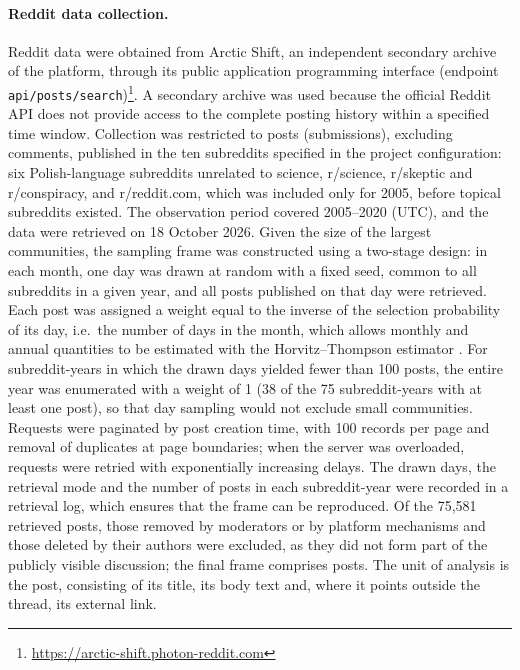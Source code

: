\documentclass[10pt,a4paper]{article}
\newcommand{\kod}[1]{\texttt{#1}}
\begin{document}
\paragraph{Reddit data collection.}
Reddit data were obtained from Arctic Shift, an independent secondary archive of the
platform, through its public application programming interface (endpoint
\kod{api/posts/search})\footnote{\url{https://arctic-shift.photon-reddit.com}}. A secondary
archive was used because the official Reddit API does not provide access to the complete
posting history within a specified time window. Collection was restricted to posts
(submissions), excluding comments, published in the ten subreddits specified in the
project configuration: six Polish-language subreddits unrelated to science, r/science,
r/skeptic and r/conspiracy, and r/reddit.com, which was included only for 2005, before
topical subreddits existed. The observation period covered 2005--2020 (UTC), and the data
were retrieved on 18 October 2026. Given the size of the largest communities, the sampling
frame was constructed using a two-stage design: in each month, one day was drawn at random
with a fixed seed, common to all subreddits in a given year, and all posts published on
that day were retrieved. Each post was assigned a weight equal to the inverse of the
selection probability of its day, i.e.\ the number of days in the month, which allows
monthly and annual quantities to be estimated with the Horvitz--Thompson estimator
\cite{horvitz1952}. For subreddit-years in which the drawn days yielded fewer than 100
posts, the entire year was enumerated with a weight of 1 (38 of the 75 subreddit-years with
at least one post), so that day sampling would not exclude small communities. Requests
were paginated by post creation time, with 100 records per page and removal of duplicates
at page boundaries; when the server was overloaded, requests were retried with
exponentially increasing delays. The drawn days, the retrieval mode and the number of
posts in each subreddit-year were recorded in a retrieval log, which ensures that the
frame can be reproduced. Of the 75,581 retrieved posts, those removed by moderators or by
platform mechanisms and those deleted by their authors were excluded, as they did not
form part of the publicly visible discussion; the final frame comprises
\resRedditFrame{} posts. The unit of analysis is the post, consisting of its title, its
body text and, where it points outside the thread, its external link.
\end{document}
